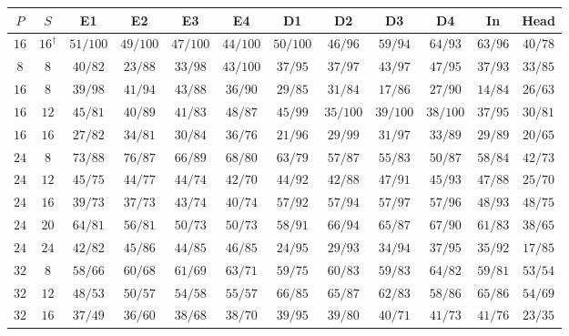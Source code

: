 \begin{table}[!tbp]
    \centering
    \small
    \setlength{\tabcolsep}{3.5pt}
    \begin{tabular}{@{}cccccccccccc@{}}
        \toprule
        \textbf{$P$} & \textbf{$S$} & \textbf{E1} & \textbf{E2} & \textbf{E3} & \textbf{E4} & \textbf{D1} & \textbf{D2} & \textbf{D3} & \textbf{D4} & \textbf{In} & \textbf{Head} \\
        \midrule
        $16$ & $16^{\dagger}$ & $51/100$ & $49/100$ & $47/100$ & $44/100$ & $50/100$ & $46/96$ & $59/94$ & $64/93$ & $63/96$ & $40/78$ \\
        \midrule
        \addlinespace[2pt]
        $8$ & $8$ & $40/82$ & $23/88$ & $33/98$ & $43/100$ & $37/95$ & $37/97$ & $43/97$ & $47/95$ & $37/93$ & $33/85$ \\
        \addlinespace[2pt]
        $16$ & $8$ & $39/98$ & $41/94$ & $43/88$ & $36/90$ & $29/85$ & $31/84$ & $17/86$ & $27/90$ & $14/84$ & $26/63$ \\
        $16$ & $12$ & $45/81$ & $40/89$ & $41/83$ & $48/87$ & $45/99$ & $35/100$ & $39/100$ & $38/100$ & $37/95$ & $30/81$ \\
        $16$ & $16$ & $27/82$ & $34/81$ & $30/84$ & $36/76$ & $21/96$ & $29/99$ & $31/97$ & $33/89$ & $29/89$ & $20/65$ \\
        \addlinespace[2pt]
        $24$ & $8$ & $73/88$ & $76/87$ & $66/89$ & $68/80$ & $63/79$ & $57/87$ & $55/83$ & $50/87$ & $58/84$ & $42/73$ \\
        $24$ & $12$ & $45/75$ & $44/77$ & $44/74$ & $42/70$ & $44/92$ & $42/88$ & $47/91$ & $45/93$ & $47/88$ & $25/70$ \\
        $24$ & $16$ & $39/73$ & $37/73$ & $43/74$ & $40/74$ & $57/92$ & $57/94$ & $57/97$ & $57/96$ & $48/93$ & $48/75$ \\
        $24$ & $20$ & $64/81$ & $56/81$ & $50/73$ & $50/73$ & $58/91$ & $66/94$ & $65/87$ & $67/90$ & $61/83$ & $38/65$ \\
        $24$ & $24$ & $42/82$ & $45/86$ & $44/85$ & $46/85$ & $24/95$ & $29/93$ & $34/94$ & $37/95$ & $35/92$ & $17/85$ \\
        \addlinespace[2pt]
        $32$ & $8$ & $58/66$ & $60/68$ & $61/69$ & $63/71$ & $59/75$ & $60/83$ & $59/83$ & $64/82$ & $59/81$ & $53/54$ \\
        $32$ & $12$ & $48/53$ & $50/57$ & $54/58$ & $55/57$ & $66/85$ & $65/87$ & $62/83$ & $58/86$ & $65/86$ & $54/69$ \\
        $32$ & $16$ & $37/49$ & $36/60$ & $38/68$ & $38/70$ & $39/95$ & $39/80$ & $40/71$ & $41/73$ & $41/76$ & $23/35$ \\

\end{tabular}
\end{table}
